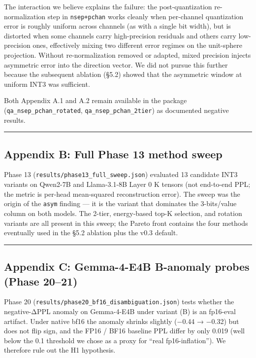 The interaction we believe explains the failure: the post-quantization
re-normalization step in \texttt{nsep+pchan} works cleanly when
per-channel quantization error is roughly uniform across channels (as
with a single bit width), but is distorted when some channels carry
high-precision residuals and others carry low-precision ones,
effectively mixing two different error regimes on the unit-sphere
projection. Without re-normalization removed or adapted, mixed precision
injects asymmetric error into the direction vector. We did not pursue
this further because the subsequent ablation (§5.2) showed that the
asymmetric window at uniform INT3 was sufficient.

Both Appendix A.1 and A.2 remain available in the package
(\texttt{qa\_nsep\_pchan\_rotated}, \texttt{qa\_nsep\_pchan\_2tier}) as
documented negative results.

\begin{center}\rule{0.5\linewidth}{0.5pt}\end{center}

\subsection{Appendix B: Full Phase 13 method
sweep}\label{appendix-b-full-phase-13-method-sweep}

Phase 13 (\texttt{results/phase13\_full\_sweep.json}) evaluated 13
candidate INT3 variants on Qwen2-7B and Llama-3.1-8B Layer 0 K tensors
(not end-to-end PPL; the metric is per-head mean-squared reconstruction
error). The sweep was the origin of the \texttt{asym} finding --- it is
the variant that dominates the 3-bits/value column on both models. The
2-tier, energy-based top-K selection, and rotation variants are all
present in this sweep; the Pareto front contains the four methods
eventually used in the §5.2 ablation plus the v0.3 default.

\begin{center}\rule{0.5\linewidth}{0.5pt}\end{center}

\subsection{Appendix C: Gemma-4-E4B B-anomaly probes (Phase
20--21)}\label{appendix-c-gemma-4-e4b-b-anomaly-probes-phase-2021}

Phase 20 (\texttt{results/phase20\_bf16\_disambiguation.json}) tests
whether the negative-ΔPPL anomaly on Gemma-4-E4B under variant (B) is an
fp16-eval artifact. Under native bf16 the anomaly shrinks slightly
(−0.44 → −0.32) but does not flip sign, and the FP16 / BF16 baseline PPL
differ by only 0.019 (well below the 0.1 threshold we chose as a proxy
for ``real fp16-inflation''). We therefore rule out the H1 hypothesis.

